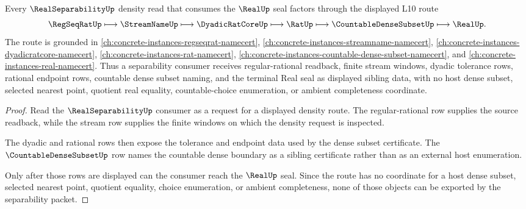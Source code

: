 \begin{theorem}
\label{thm:real-separability-l10-certificate-route}
Every $\RealSeparabilityUp$ density read that consumes the $\RealUp$ seal factors through the displayed L10 route
$$
\RegSeqRatUp \longmapsto \StreamNameUp \longmapsto \DyadicRatCoreUp \longmapsto \RatUp \longmapsto \CountableDenseSubsetUp \longmapsto \RealUp.
$$
The route is grounded in \autoref{ch:concrete-instances-regseqrat-namecert}, \autoref{ch:concrete-instances-streamname-namecert}, \autoref{ch:concrete-instances-dyadicratcore-namecert}, \autoref{ch:concrete-instances-rat-namecert}, \autoref{ch:concrete-instances-countable-dense-subset-namecert}, and \autoref{ch:concrete-instances-real-namecert}. Thus a separability consumer receives regular-rational readback, finite stream windows, dyadic tolerance rows, rational endpoint rows, countable dense subset naming, and the terminal Real seal as displayed sibling data, with no host dense subset, selected nearest point, quotient real equality, countable-choice enumeration, or ambient completeness coordinate.
\end{theorem}
\begin{proof}
Read the $\RealSeparabilityUp$ consumer as a request for a displayed density route. The regular-rational row supplies the source readback, while the stream row supplies the finite windows on which the density request is inspected.

The dyadic and rational rows then expose the tolerance and endpoint data used by the dense subset certificate. The $\CountableDenseSubsetUp$ row names the countable dense boundary as a sibling certificate rather than as an external host enumeration.

Only after those rows are displayed can the consumer reach the $\RealUp$ seal. Since the route has no coordinate for a host dense subset, selected nearest point, quotient equality, choice enumeration, or ambient completeness, none of those objects can be exported by the separability packet.
\end{proof}
